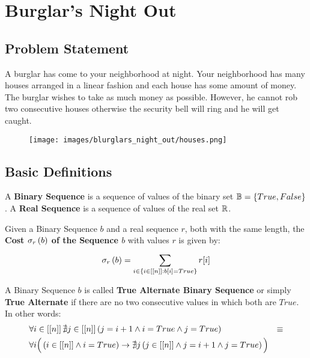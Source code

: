 \chapter{Burglar's Night Out}

\section{Problem Statement}

A burglar has come to your neighborhood at night. Your neighborhood has many houses arranged in a linear fashion and each house has some amount of money. The burglar wishes to take as much money as possible. However, he cannot rob two consecutive houses otherwise the security bell will ring and he will get caught.

\begin{figure}[H]
    \centering
    \texttt{[image: images/blurglars\_night\_out/houses.png]}
\end{figure}

\section{Basic Definitions}

\newcommand{\binarySet}{\ensuremath{\mathbb{B}}}
\renewcommand{\cost}[2]{\ensuremath{\apply{\sigma_{#2}}{#1}}}

\begin{defn}
    A \textbf{Binary Sequence} is a sequence of values of the binary set $\binarySet = \Set{True, False}$.
    A \textbf{Real Sequence} is a sequence of values of the real set $\mathbb{R}$.
\end{defn}

\begin{defn}
    Given a Binary Sequence $b$ and a real sequence $r$, both with the same length, the \textbf{Cost $\cost{b}{r}$ of the Sequence $b$} with values $r$ is given by:
    \begin{equation}
        \cost{b}{r} = \Sum{i \in \SetOf{i \in \range{n}}{b[i] = True}}{}{r[i]}
    \end{equation}
\end{defn}

\begin{defn}
    A Binary Sequence $b$ is called \textbf{True Alternate Binary Sequence} or simply \textbf{True Alternate} if there are no two consecutive values in which both are $True$. In other words:
    \begin{align}
        & \forall i \in \left[\left[ n \right]\right] \nexists j \in \left[\left[ n \right]\right] \left(
            j = i + 1
            \land
            i = True
            \land
            j = True
        \right)
        & \equiv \\\nonumber
        &
        \forall i \Big(
            \left(i \in \left[\left[ n \right]\right] \land i = True\right)
            \rightarrow
            \nexists j \left(
                j \in \left[\left[ n \right]\right]
                \land
                j = i + 1
                \land
                j = True
            \right)
        \Big) &
    \end{align}
\end{defn}

